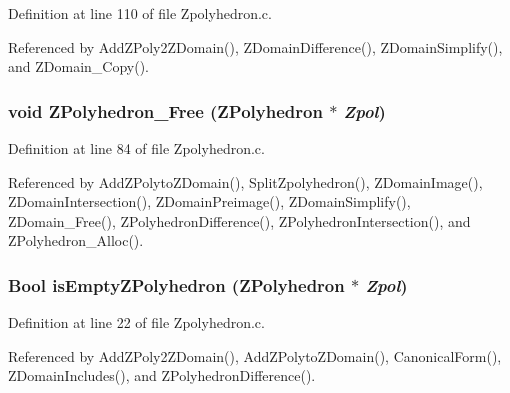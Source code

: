 Definition at line 110 of file Zpolyhedron.c.

Referenced by Add\-ZPoly2ZDomain(), ZDomain\-Difference(), ZDomain\-Simplify(), and ZDomain\_\-Copy().

\subsubsection{\setlength{\rightskip}{0pt plus 5cm}void ZPolyhedron\_\-Free (ZPolyhedron $\ast$ {\em Zpol})\hspace{0.3cm}{\tt  [static]}}\label{Zpolyhedron_8c_a3}




Definition at line 84 of file Zpolyhedron.c.

Referenced by Add\-ZPolyto\-ZDomain(), Split\-Zpolyhedron(), ZDomain\-Image(), ZDomain\-Intersection(), ZDomain\-Preimage(), ZDomain\-Simplify(), ZDomain\_\-Free(), ZPolyhedron\-Difference(), ZPolyhedron\-Intersection(), and ZPolyhedron\_\-Alloc().

\subsubsection{\setlength{\rightskip}{0pt plus 5cm}Bool is\-Empty\-ZPolyhedron (ZPolyhedron $\ast$ {\em Zpol})}\label{Zpolyhedron_8c_a9}




Definition at line 22 of file Zpolyhedron.c.

Referenced by Add\-ZPoly2ZDomain(), Add\-ZPolyto\-ZDomain(), Canonical\-Form(), ZDomain\-Includes(), and ZPolyhedron\-Difference().

